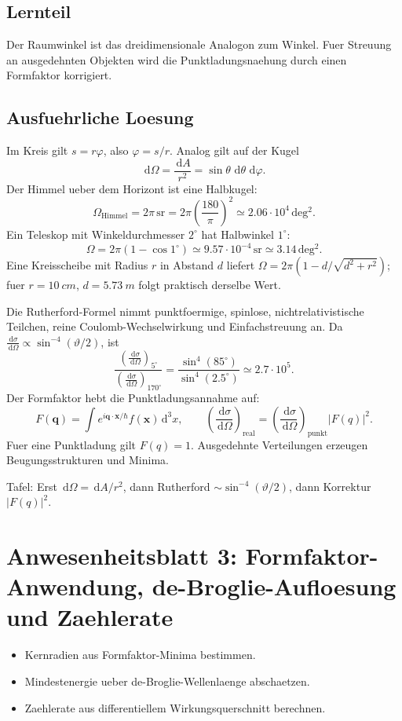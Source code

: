 \documentclass[11pt,a4paper]{scrartcl}
\newcommand{\dd}{\,\mathrm{d}}
\newcommand{\vect}[1]{\bm{#1}}
\newcommand{\abs}[1]{\left|#1\right|}
\newcommand{\diffxs}{\frac{\dd\sigma}{\dd\Omega}}
\begin{document}
\subsection{Lernteil}
\begin{learningbox}Der Raumwinkel ist das dreidimensionale Analogon zum Winkel. Fuer Streuung an ausgedehnten Objekten wird die Punktladungsnaehung durch einen Formfaktor korrigiert.\end{learningbox}
\subsection{Ausfuehrliche Loesung}
\begin{calculationbox}[title={Raumwinkel}]
Im Kreis gilt \(s=r\varphi\), also \(\varphi=s/r\). Analog gilt auf der Kugel
\[\dd\Omega=\frac{\dd A}{r^2}=\sin\theta\,\dd\theta\,\dd\varphi.\]
Der Himmel ueber dem Horizont ist eine Halbkugel:
\[\Omega_{\mathrm{Himmel}}=2\pi\,\mathrm{sr}=2\pi\left(\frac{180}{\pi}\right)^2\simeq 2.06\cdot10^4\,\mathrm{deg^2}.\]
Ein Teleskop mit Winkeldurchmesser \(2^\circ\) hat Halbwinkel \(1^\circ\):
\[\Omega=2\pi(1-
\cos1^\circ)\simeq9.57\cdot10^{-4}\,\mathrm{sr}\simeq3.14\,\mathrm{deg^2}.\]
Eine Kreisscheibe mit Radius \(r\) in Abstand \(d\) liefert \(\Omega=2\pi(1-d/\sqrt{d^2+r^2})\); fuer \(r=\SI{10}{cm}\), \(d=\SI{5.73}{m}\) folgt praktisch derselbe Wert.
\end{calculationbox}
\begin{calculationbox}[title={Rutherford und Formfaktor}]
Die Rutherford-Formel nimmt punktfoermige, spinlose, nichtrelativistische Teilchen, reine Coulomb-Wechselwirkung und Einfachstreuung an. Da \(\diffxs\propto\sin^{-4}(\vartheta/2)\), ist
\[\frac{(\diffxs)_{5^\circ}}{(\diffxs)_{170^\circ}}=\frac{\sin^4(85^\circ)}{\sin^4(2.5^\circ)}\simeq2.7\cdot10^5.\]
Der Formfaktor hebt die Punktladungsannahme auf:
\[F(\vect q)=\int e^{i\vect q\cdot\vect x/\hbar}f(\vect x)\dd^3x,\qquad \left(\diffxs\right)_{\mathrm{real}}=\left(\diffxs\right)_{\mathrm{punkt}}\abs{F(q)}^2.\]
Fuer eine Punktladung gilt \(F(q)=1\). Ausgedehnte Verteilungen erzeugen Beugungsstrukturen und Minima.
\end{calculationbox}
\begin{talkbox}Tafel: Erst \(\dd\Omega=\dd A/r^2\), dann Rutherford \(\sim\sin^{-4}(\vartheta/2)\), dann Korrektur \(\abs{F(q)}^2\).\end{talkbox}


\section{Anwesenheitsblatt 3: Formfaktor-Anwendung, de-Broglie-Aufloesung und Zaehlerate}
\begin{taskbox}\begin{itemize}\item Kernradien aus Formfaktor-Minima bestimmen.\item Mindestenergie ueber de-Broglie-Wellenlaenge abschaetzen.\item Zaehlerate aus differentiellem Wirkungsquerschnitt berechnen.\end{itemize}\end{taskbox}
\end{document}
